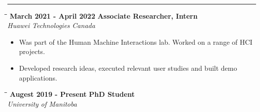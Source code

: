 \documentclass[a4paper,11pt]{article}
\begin{document}
\vspace{15pt}
\noindent\textbf{\large{}}
\vspace{-8pt}\noindent\\\rule{0.75\textwidth}{0.4pt}
\vspace{-8pt}
\begin{tabbing}
  \=\hspace*{6cm}\=\hspace*{5cm}\= \kill
  \>\textbf{\large \textbar{}}\textbf{ March 2021 - April 2022} \> \textbf{Associate Researcher, Intern}\\\>\> \emph{Huawei Technologies Canada}
\end{tabbing}
\vspace{-8pt}
\begin{itemize}
  \setlength\itemsep{0pt}
  \item Was part of the Human Machine Interactions lab. Worked on a range of HCI projects.
  \item Developed research ideas, executed relevant user studies and built demo applications.
\end{itemize}
\begin{tabbing}
  \=\hspace*{6cm}\=\hspace*{5cm}\= \kill
  \>\textbf{\large \textbar{}}\textbf{ Augest 2019 - Present} \> \textbf{PhD Student}\\\>\> \emph{University of Manitoba}
\end{tabbing}
\end{document}
